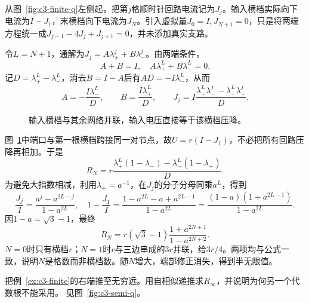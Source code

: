 \begin{solution}
从图~\ref{fig:c3-finite-q}左侧起，把第$j$格顺时针回路电流记为$J_j$。输入横档实际向下电流为$I-J_1$，末横档向下电流为$J_N$。引入虚拟量$J_0=I,J_{N+1}=0$，只是将两端方程统一成$J_{j-1}-4J_j+J_{j+1}=0$，并未添加真实支路。

令$L=N+1$，通解为$J_j=A\lambda_+^j+B\lambda_-^j$。由两端条件，
\[
 A+B=I,\quad A\lambda_+^L+B\lambda_-^L=0.
\]
记$D=\lambda_+^L-\lambda_-^L$，消去$B=I-A$后有$AD=-I\lambda_-^L$，从而
\[
 A=-\frac{I\lambda_-^L}D,\qquad B=\frac{I\lambda_+^L}D,
 \qquad J_j=I\frac{\lambda_+^L\lambda_-^j-\lambda_-^L\lambda_+^j}D.
\]
\begin{figure}[H]\centering
{}
\caption{输入横档与其余网络并联，输入电压直接等于该横档压降。}\label{fig:c3-finite-s}
\end{figure}
图~\ref{fig:c3-finite-s}中端口与第一根横档跨接同一对节点，故$U=r(I-J_1)$，不必把所有回路压降再相加。于是
\[
 R_N=r\frac{\lambda_+^L(1-\lambda_-)-\lambda_-^L(1-\lambda_+)}D.
\]
为避免大指数相减，利用$\lambda_+=a^{-1}$，在$J_j$的分子分母同乘$a^L$，得到
\[
 \frac{J_j}I=\frac{a^j-a^{2L-j}}{1-a^{2L}},\quad
 1-\frac{J_1}I
 =\frac{1-a^{2L}-a+a^{2L-1}}{1-a^{2L}}
 =\frac{(1-a)(1+a^{2L-1})}{1-a^{2L}}.
\]
因$1-a=\sqrt3-1$，最终
\[
 \boxed{R_N=r(\sqrt3-1)\frac{1+a^{2N+1}}{1-a^{2N+2}}}.
\]
$N=0$时只有横档$r$；$N=1$时$r$与三边串成的$3r$并联，给$3r/4$。两项均与公式一致，说明$N$是格数而非横档数。随$N$增大，端部修正消失，得到半无限值。
\end{solution}

\begin{example}[半无限梯形的递推与收敛]\label{ex:c3-semi}
把例~\ref{ex:c3-finite}的右端推至无穷远。用自相似递推求$R_\infty$，并说明为何另一个代数根不能采用。 见图~\ref{fig:c3-semi-q}。
\end{example}

